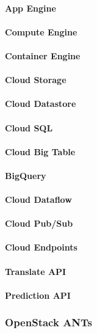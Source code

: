 \documentclass{acm_proc_article-sp}
\begin{document}
\paragraph{App Engine}
\paragraph{Compute Engine}
\paragraph{Container Engine}
\paragraph{Cloud Storage}
\paragraph{Cloud Datastore}
\paragraph{Cloud SQL}
\paragraph{Cloud Big Table}
\paragraph{BigQuery}
\paragraph{Cloud Dataflow}
\paragraph{Cloud Pub/Sub}
\paragraph{Cloud Endpoints}
\paragraph{Translate API}
\paragraph{Prediction API}
\subsubsection{OpenStack ANTs}
\end{document}
